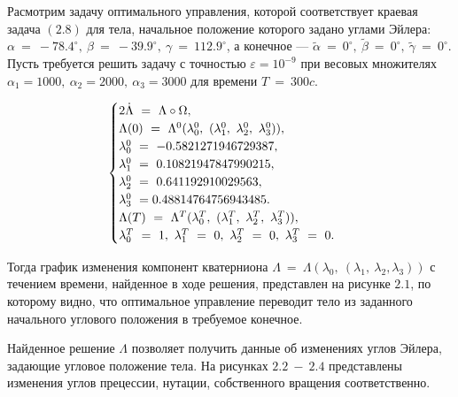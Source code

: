 \documentclass[14pt]{extreport}
\begin{document}
Расмотрим задачу оптимального управления, которой соответствует краевая задача $(2.8)$ для тела, начальное положение которого задано углами Эйлера:
$\alpha\ =\ -78.4^{\circ},\ \beta\ =\ -39.9^{\circ},\ \gamma\ =\ 112.9^{\circ}$,
а конечное --- $\widetilde\alpha\ =\ 0^{\circ},\ \widetilde\beta\ =\ 0^{\circ},\ \widetilde\gamma\ =\ 0^{\circ}$. 
Пусть требуется решить задачу с точностью $\varepsilon = 10^{-9}$ при весовых множителях $\alpha_1 = 1000,\ \alpha_2 = 2000,\ \alpha_3 = 3000$ для времени
$T\ =\ 300c$.

\begin{equation}
\begin{cases}
2\dot{\Lambda}\ =\ \Lambda \circ \Omega,\\
 \Lambda(0)\ =\ \Lambda^{0}(\lambda_0^{0},\ (\lambda_1^{0},\ \lambda_2^{0},\ \lambda_3^{0})), \\
 \lambda_{0}^{0}\ =\ -0.5821271946729387, \\
 \lambda_{1}^{0}\ =\ 0.10821947847990215, \\
 \lambda_{2}^{0}\ =\ 0.641192910029563, \\
 \lambda_{3}^{0}\ =\-0.48814764756943485. \\
 \Lambda(T)\ =\ \Lambda^{T}(\lambda_0^{T},\ (\lambda_1^{T},\ \lambda_2^{T},\ \lambda_3^{T})), \\
 \lambda_{0}^{T}\ =\ 1, \ 
 \lambda_{1}^{T}\ =\ 0, \ 
 \lambda_{2}^{T}\ =\ 0, \ 
 \lambda_{3}^{T}\ =\ 0. \ 
 \end{cases}
\end{equation}

Тогда график изменения компонент кватерниона $\Lambda\ =\ \Lambda(\lambda_0,\ (\lambda_1,\ \lambda_2, \lambda_3))$ с течением времени,
найденное в ходе решения, представлен на рисунке $2.1$, по которому видно, что оптимальное управление переводит тело из заданного начального
углового положения в требуемое конечное.

Найденное решение $\Lambda$ позволяет получить данные об изменениях углов Эйлера, задающие угловое положение тела.
На рисунках $2.2\ -\ 2.4$ представлены изменения углов прецессии, нутации, собственного вращения соответственно.
\end{document}
